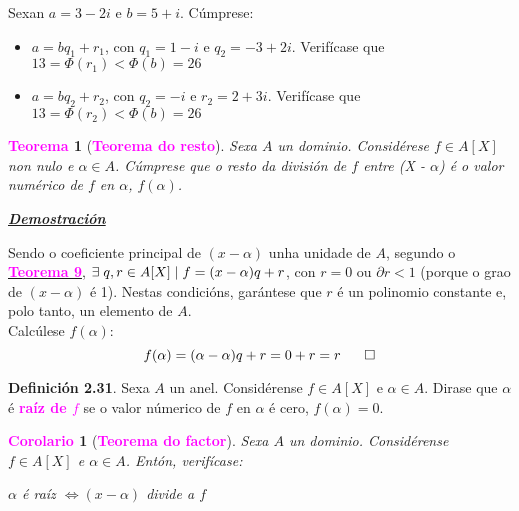 \documentclass[twoside]{report}
\newcommand{\magbf}[1]{\textcolor{magenta}{\textbf{#1}}} %
\theoremstyle{mystyle}
\newtheorem{theo}{\magbf{Teorema}}[chapter]
\newtheorem{cor}{\magbf{Corolario}}[chapter]
\newenvironment{theorem}
{\begin{mdframed}[linecolor = magenta,backgroundcolor = classicrose, linewidth = 2mm]\begin{theo}}
{\end{theo}\end{mdframed}}
\newenvironment{corollary}
{\begin{mdframed}[linecolor = magenta,backgroundcolor = classicrose, linewidth = 2mm]\begin{cor}}
{\end{cor}\end{mdframed}}
\begin{document}
\noindent Sexan $a = 3 - 2i$ e $b = 5 + i$. Cúmprese:

\begin{itemize}
    \item $a = bq_{1} + r_{1}$, con $q_{1} = 1 - i$ e $q_{2} = -3 + 2i$. Verifícase que $13 = \Phi(r_{1}) < \Phi(b) = 26$
    \item $a = bq_{2} + r_{2}$, con $q_{2} = -i$ e $r_{2} = 2 + 3i$. Verifícase que $13 = \Phi(r_{2}) < \Phi(b) = 26$
\end{itemize}

\vspace{3mm}

\begin{theorem}[\magbf{Teorema do resto}] \label{th2.10}
Sexa $A$ un dominio. Considérese $f \in A[X]$ non nulo e $\alpha \in A$. Cúmprese que o resto da división de $f$ entre (X - $\alpha$) é o valor numérico de $f$ en $\alpha$, $f(\alpha)$.
\end{theorem}

\vspace{2mm}

\noindent \textbf{\textit{\underline{Demostración}}}

\vspace{2mm}

\noindent Sendo o coeficiente principal de $(x-\alpha)$ unha unidade de $A$, segundo o \hyperref[th2.9]{\magbf{Teorema 9}}, $\exists \hspace{1mm} q,r \in A[X] \hspace{1mm} | \hspace{1mm} f = (x-\alpha)q + r$, con $r = 0$ ou $\partial r < 1$ (porque o grao de $(x-\alpha)$ é 1). Nestas condicións, garántese que $r$ é un polinomio constante e, polo tanto, un elemento de $A$.\\

\noindent Calcúlese $f(\alpha)$:
$$f(\alpha) = (\alpha - \alpha)q + r = 0 + r = r \hspace{6mm} \square\\$$

\vspace{3mm}

\noindent \textbf{Definición 2.31}. Sexa $A$ un anel. Considérense $f \in A[X]$ e $\alpha \in A$. Dirase que $\alpha$ é \magbf{raíz de $f$} se o valor númerico de $f$ en $\alpha$ é cero, $f(\alpha) = 0$.\\

\begin{corollary}[\magbf{Teorema do factor}] \label{cor2.6}
Sexa $A$ un dominio. Considérense $f \in A[X]$ e $\alpha \in A$. Entón, verifícase:
\begin{center}
    $\alpha$ é raíz $\Longleftrightarrow (x-\alpha)$ divide a $f$
\end{center}
\end{corollary}
\end{document}
